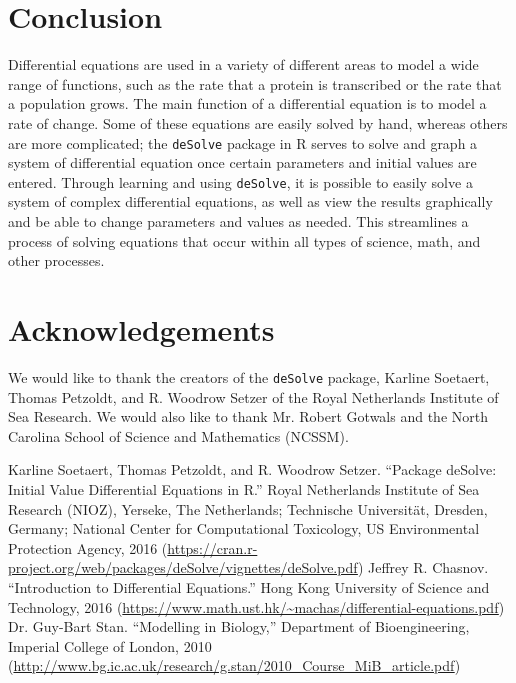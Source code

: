 \section{Conclusion}

Differential equations are used in a variety of different areas to model a wide range of functions, such as the rate that a protein is transcribed or the rate that a population grows.
The main function of a differential equation is to model a rate of change.
Some of these equations are easily solved by hand, whereas others are more complicated;
the \texttt{deSolve} package in R serves to solve and graph a system of differential equation once certain parameters and initial values are entered.
Through learning and using \texttt{deSolve}, it is possible to easily solve a system of complex differential equations, as well as view the results graphically and be able to change parameters and values as needed.
This streamlines a process of solving equations that occur within all types of science, math, and other processes.

\section{Acknowledgements}

We would like to thank the creators of the \texttt{deSolve} package, Karline Soetaert, Thomas Petzoldt, and R.
Woodrow Setzer of the Royal Netherlands Institute of Sea Research.
We would also like to thank Mr. Robert Gotwals and the North Carolina School of Science and Mathematics (NCSSM).

\begin{thebibliography}{3}
        Karline Soetaert, Thomas Petzoldt, and R. Woodrow Setzer. ``Package deSolve: Initial Value Differential Equations in R.'' Royal Netherlands Institute of Sea Research (NIOZ), Yerseke, The Netherlands; Technische Universit{\"a}t, Dresden, Germany; National Center for Computational Toxicology, US Environmental Protection Agency, 2016 (\url{https://cran.r-project.org/web/packages/deSolve/vignettes/deSolve.pdf})
        Jeffrey R. Chasnov. ``Introduction to Differential Equations.'' Hong Kong University of Science and Technology, 2016 (\url{https://www.math.ust.hk/~machas/differential-equations.pdf})
        Dr. Guy-Bart Stan. ``Modelling in Biology,'' Department of Bioengineering, Imperial College of London, 2010 (\url{http://www.bg.ic.ac.uk/research/g.stan/2010_Course_MiB_article.pdf})
\end{thebibliography}
